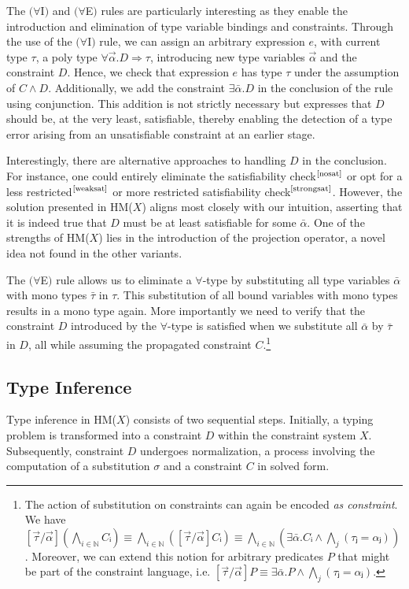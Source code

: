 \documentclass[runningheads]{llncs}
\newcommand{\hmx}{HM($X$)}
\begin{document}
The $(∀$I$)$ and $(∀$E$)$ rules are particularly interesting as they
enable the introduction and elimination of type variable bindings and
constraints.
Through the use of the $(∀$I$)$ rule, we can assign an arbitrary
expression $e$, with current type $τ$, a poly type $∀ \Vec α.D ⇒ τ$,
introducing new type variables $\Vec α$ and the constraint $D$.
Hence, we check that expression $e$ has type $τ$ under the assumption of
$C ∧ D$.
Additionally, we add the constraint $∃\bar{α}. D$ in the conclusion of
the rule using conjunction.
This addition is not strictly necessary but expresses that $D$ should be,
at the very least, satisfiable, thereby enabling the detection of a type
error arising from an unsatisfiable constraint at an earlier stage.

Interestingly, there are alternative approaches to handling $D$ in the
conclusion. For instance, one could entirely eliminate the satisfiability
check$^\text{\cite{nosat}}$ or opt for a less
restricted$^\text{\cite{weaksat}}$ or more restricted satisfiability
check$^\text{\cite{strongsat}}$. However, the solution presented in \hmx{}
aligns most closely with our intuition, asserting that it is indeed true that
$D$ must be at least satisfiable for some $\bar α$. One of the strengths of
\hmx{} lies in the introduction of the projection operator, a novel idea not
found in the other variants.

The $(∀$E$)$ rule allows us to eliminate a $∀$-type by substituting all
type variables $\bar{α}$ with mono types $\bar{τ}$ in $τ$. This substitution
of all bound variables with mono types results in a mono type again. More
importantly we need to verify that the constraint $D$ introduced by the
$∀$-type is satisfied when we substitute all $\bar{α}$ by $\bar{τ}$ in $D$, all
while assuming the propagated constraint $C$.\footnote{
The action of substitution on constraints can again be encoded
\emph{as constraint}.
We have $[\Vec τ / \Vec α] (⋀_{i ∈ ℕ} Cᵢ) ≡ ⋀_{i ∈ ℕ} ([\Vec τ / \Vec
      α]Cᵢ) ≡
  ⋀_{i ∈ ℕ} (∃\bar{α}. Cᵢ ∧ ⋀_{j}(τⱼ = αⱼ))$.
Moreover, we can extend this notion for arbitrary predicates $P$ that might be
part of the constraint language, i.e. $[\Vec τ / \Vec α]P ≡ ∃\bar{α}. P ∧
  ⋀_{j}(τⱼ = αⱼ)$.
}

\subsection{Type Inference}
Type inference in \hmx{} consists of two sequential steps. Initially, a
typing
problem is transformed into a constraint $D$ within the constraint system
$X$.
Subsequently, constraint $D$ undergoes normalization, a process involving
the
computation of a substitution $σ$ and a constraint $C$ in solved form.
\end{document}
